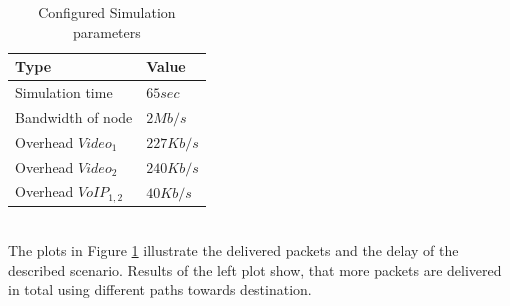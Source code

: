 \documentclass[runningheads]{llncs}
\begin{document}
	\begin{table}[h]
		\centering
		\caption{Configured Simulation parameters}
		\begin{tabular}{l|l} %
			\textbf{Type} & \textbf{Value} \\
			\hline
			Simulation time & $65sec$\\
			Bandwidth of  node & $2Mb/s$\\
			Overhead $Video_{1}$ & $227Kb/s$\\
			Overhead $Video_{2}$ & $240Kb/s$\\
			Overhead $VoIP_{1,2}$ & $40Kb/s$
		\end{tabular}
	\label{tab:ScenarioParameters}
	\end{table}\\
	 The plots in Figure \ref{tab:ScenarioParameters} illustrate the delivered packets and the delay of the described scenario. Results of the left plot show, that more packets are delivered in total using different paths towards destination.
\end{document}
